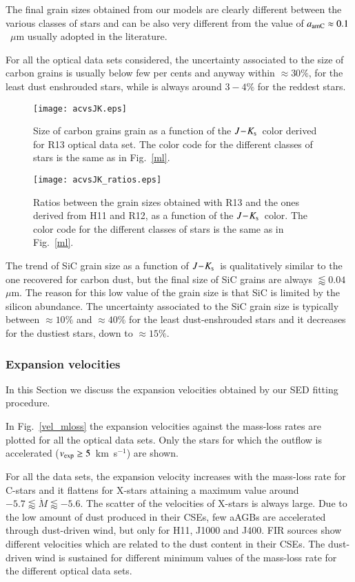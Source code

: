 \documentclass[useAMS,usenatbib]{mn2e/mn2e}
\newcommand{\jks}{\mbox{$J\!-\!K_{\rm s}$}}
\begin{document}
{The final grain sizes obtained from our models are clearly different between the various classes of stars and can be also very different from the value of $a_{\rm amC}\approx 0.1$~$\mu$m usually adopted in the literature.

For all the optical data sets considered, the uncertainty associated to the size of carbon grains is usually below few per cents and anyway within $\approx$30$\%$, for the least dust enshrouded stars, while is always around $3-4\%$ for the reddest stars.

\begin{figure}
\texttt{[image: acvsJK.eps]}
                \caption{ Size of carbon grains grain as a function of the \jks\ color derived for R13 optical data set. The color code for the different classes of stars is the same as in Fig.~\ref{ml}.}
        \label{rc}
        \end{figure}


\begin{figure}
\texttt{[image: acvsJK\_ratios.eps]}
        \caption{Ratios between the grain sizes obtained with R13 and the ones derived from H11 and R12, as a function of the \jks\ color. The color code for the different classes of stars is the same as in Fig.~\ref{ml}.}
        \label{size_scaled_f}
        \end{figure}

The trend of SiC grain size as a function of \jks\ is qualitatively similar to the one recovered for carbon dust, but the final size of SiC grains are always $\lessapprox0.04$~$\mu$m. 
The reason for this low value of the grain size is that SiC is limited by the silicon abundance.
The uncertainty associated to the SiC grain size is typically between $\approx10\%$ and $\approx40\%$ for the least dust-enshrouded stars and it decreases for the dustiest stars, down to $\approx15\%$.

\subsubsection{Expansion velocities}\label{V_scaling}
In this Section we discuss the expansion velocities obtained by our SED fitting procedure.

In Fig.~\ref{vel_mloss} the expansion velocities against the mass-loss rates are plotted for all the optical data sets. Only the stars for which the outflow is accelerated ($v_{\rm exp} \ge 5$~km~s$^{-1}$) are shown.

For all the data sets, the expansion velocity increases with the mass-loss rate for C-stars and it flattens for X-stars attaining a maximum value around $-5.7\lessapprox\dot{M}\lessapprox-5.6$. The scatter of the velocities of X-stars is always large.
Due to the low amount of dust produced in their CSEs, few aAGBs are accelerated through dust-driven wind, but only for H11, J1000 and J400.
FIR sources show different velocities which are related to the dust content in their CSEs.
The dust-driven wind is sustained for different minimum values of the mass-loss rate for the different optical data sets.

}
\end{document}

